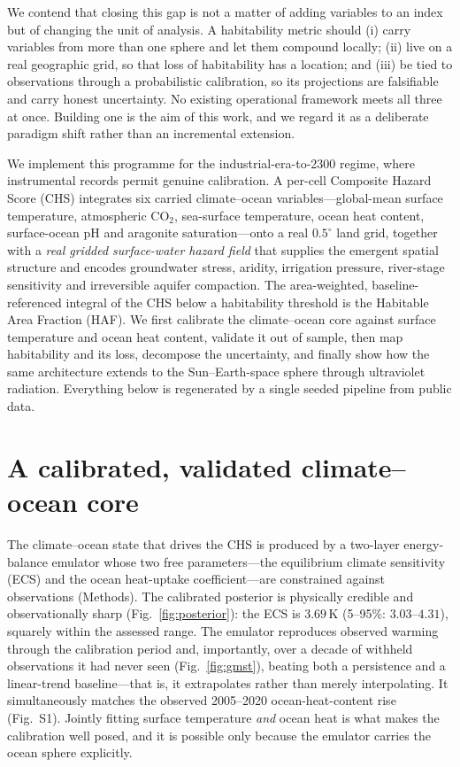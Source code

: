 \documentclass[10pt]{article}
\begin{document}
We contend that closing this gap is not a matter of adding variables to an index
but of changing the unit of analysis. A habitability metric should (i) carry
variables from more than one sphere and let them compound locally; (ii) live on a
real geographic grid, so that loss of habitability has a location; and (iii) be
tied to observations through a probabilistic calibration, so its projections are
falsifiable and carry honest uncertainty. No existing operational framework meets
all three at once. Building one is the aim of this work, and we regard it as a
deliberate paradigm shift rather than an incremental extension.

We implement this programme for the industrial-era-to-2300 regime, where
instrumental records permit genuine calibration. A per-cell Composite Hazard Score
(CHS) integrates six carried climate--ocean variables—global-mean surface
temperature, atmospheric CO$_2$, sea-surface temperature, ocean heat content,
surface-ocean pH and aragonite saturation—onto a real $0.5^{\circ}$ land grid,
together with a \emph{real gridded surface-water hazard field} that supplies the
emergent spatial structure and encodes groundwater stress, aridity, irrigation
pressure, river-stage sensitivity and irreversible aquifer compaction. The
area-weighted, baseline-referenced integral of the CHS below a habitability
threshold is the Habitable Area Fraction (HAF). We first calibrate the
climate--ocean core against surface temperature and ocean heat content, validate
it out of sample, then map habitability and its loss, decompose the uncertainty,
and finally show how the same architecture extends to the Sun--Earth-space sphere
through ultraviolet radiation. Everything below is regenerated by a single seeded
pipeline from public data.

\section*{A calibrated, validated climate--ocean core}
The climate--ocean state that drives the CHS is produced by a two-layer
energy-balance emulator\citep{Geoffroy2013, Leach2021} whose two free
parameters—the equilibrium climate sensitivity (ECS) and the ocean heat-uptake
coefficient—are constrained against observations (Methods). The calibrated
posterior is physically credible and observationally sharp
(Fig.~\ref{fig:posterior}): the ECS is $3.69$\,K (5--95\%: $3.03$--$4.31$),
squarely within the assessed range\citep{Sherwood2020}. The emulator reproduces
observed warming through the calibration period and, importantly, over a decade of
withheld observations it had never seen (Fig.~\ref{fig:gmst}), beating both a
persistence and a linear-trend baseline—that is, it extrapolates rather than
merely interpolating. It simultaneously matches the observed 2005--2020
ocean-heat-content rise (Fig.~S1). Jointly fitting surface temperature \emph{and}
ocean heat is what makes the calibration well posed, and it is possible only
because the emulator carries the ocean sphere explicitly.
\end{document}

